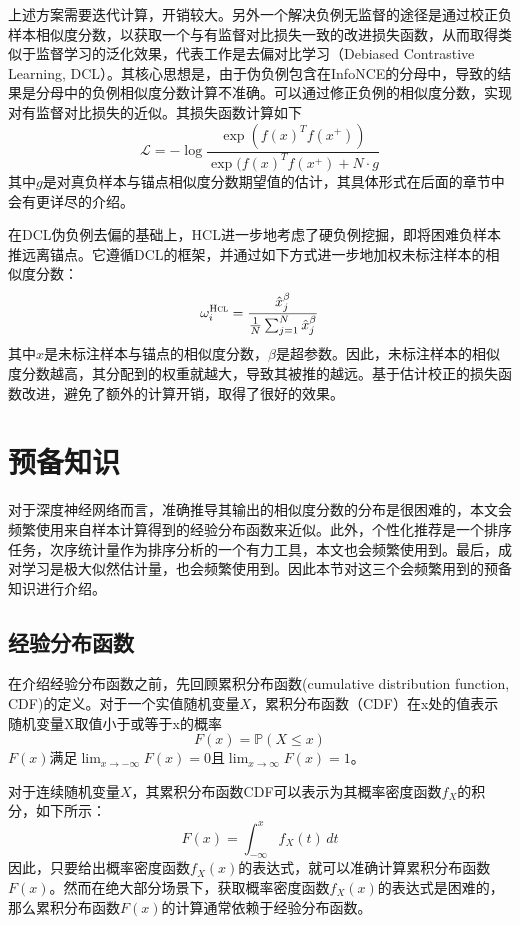 上述方案需要迭代计算，开销较大。另外一个解决负例无监督的途径是通过校正负样本相似度分数，以获取一个与有监督对比损失一致的改进损失函数，从而取得类似于监督学习的泛化效果，代表工作是去偏对比学习\cite{Chuang:2020:NIPS}（Debiased Contrastive Learning, DCL）。其核心思想是，由于伪负例包含在InfoNCE的分母中，导致的结果是分母中的负例相似度分数计算不准确。可以通过修正负例的相似度分数，实现对有监督对比损失的近似。其损失函数计算如下
\[
\mathcal{L} = -\log \frac{\exp(f(x)^Tf(x^+))}{\exp(f(x)^Tf(x^+) + N\cdot g}
\]
其中$g$是对真负样本与锚点相似度分数期望值的估计，其具体形式在后面的章节中会有更详尽的介绍。

在DCL\cite{Chuang:2020:NIPS}伪负例去偏的基础上，HCL\cite{Robinson:2021:ICLR}进一步地考虑了硬负例挖掘，即将困难负样本推远离锚点。它遵循DCL的框架，并通过如下方式进一步地加权未标注样本的相似度分数：
\[\omega_i^\textsc{Hcl} = \frac{\hat{x}_j^\beta}{\frac{1}{N} \sum_{j=1}^{N}\hat{x}_j^\beta}
\]
其中$\hat{x}$是未标注样本与锚点的相似度分数，$\beta$是超参数。因此，未标注样本的相似度分数越高，其分配到的权重就越大，导致其被推的越远。基于估计校正的损失函数改进，避免了额外的计算开销，取得了很好的效果。

\section{预备知识}
对于深度神经网络而言，准确推导其输出的相似度分数的分布是很困难的，本文会频繁使用来自样本计算得到的经验分布函数来近似。此外，个性化推荐是一个排序任务，次序统计量作为排序分析的一个有力工具，本文也会频繁使用到。最后，成对学习是极大似然估计量，也会频繁使用到。因此本节对这三个会频繁用到的预备知识进行介绍。


\subsection{经验分布函数}
在介绍经验分布函数之前，先回顾累积分布函数(cumulative distribution function, CDF)的定义。对于一个实值随机变量$X$，累积分布函数（CDF）在x处的值表示随机变量X取值小于或等于x的概率
\[F(x) = \mathbb P (X\leq x)\]
$F(x)$满足${\displaystyle \lim _{x\rightarrow -\infty }F(x)=0}$且${\displaystyle \lim _{x\rightarrow \infty }F(x)=1}$。

对于连续随机变量$X$，其累积分布函数CDF可以表示为其概率密度函数$f_X$的积分，如下所示：
\[{\displaystyle F(x)=\int _{-\infty }^{x}f_{X}(t)\,dt}\]
因此，只要给出概率密度函数$f_X(x)$的表达式，就可以准确计算累积分布函数$F(x)$。然而在绝大部分场景下，获取概率密度函数$f_X(x)$的表达式是困难的，那么累积分布函数$F(x)$的计算通常依赖于经验分布函数。

